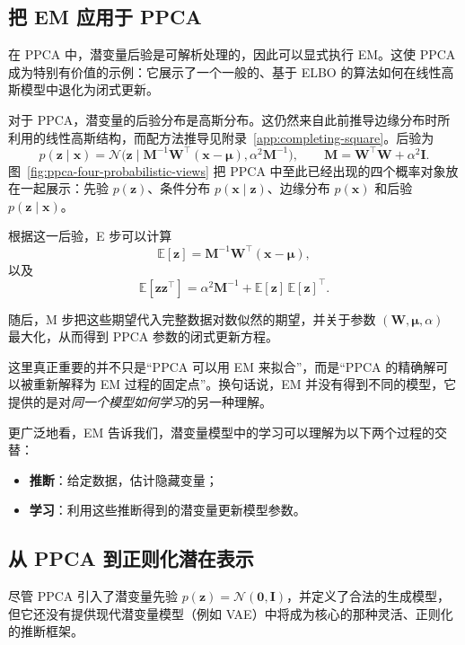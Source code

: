 

\subsection{把 EM 应用于 PPCA}

在 PPCA 中，潜变量后验是可解析处理的，因此可以显式执行 EM。这使 PPCA 成为特别有价值的示例：它展示了一个一般的、基于 ELBO 的算法如何在线性高斯模型中退化为闭式更新。

对于 PPCA，潜变量的后验分布是高斯分布。这仍然来自此前推导边缘分布时所利用的线性高斯结构，而配方法推导见附录~\ref{app:completing-square}。后验为
\[
p(\mathbf{z}\mid\mathbf{x})
=
\mathcal{N}\!\bigl(
\mathbf{z}\mid
\mathbf{M}^{-1}\mathbf{W}^\top(\mathbf{x}-\boldsymbol{\mu}),
\alpha^2\mathbf{M}^{-1}
\bigr),
\qquad
\mathbf{M}=\mathbf{W}^\top\mathbf{W}+\alpha^2\mathbf{I}.
\]
图~\ref{fig:ppca-four-probabilistic-views} 把 PPCA 中至此已经出现的四个概率对象放在一起展示：先验 \(p(\mathbf{z})\)、条件分布 \(p(\mathbf{x}\mid\mathbf{z})\)、边缘分布 \(p(\mathbf{x})\) 和后验 \(p(\mathbf{z}\mid\mathbf{x})\)。



根据这一后验，E 步可以计算
\[
\mathbb{E}[\mathbf{z}]
=
\mathbf{M}^{-1}\mathbf{W}^\top(\mathbf{x}-\boldsymbol{\mu}),
\]
以及
\[
\mathbb{E}[\mathbf{z}\mathbf{z}^\top]
=
\alpha^2\mathbf{M}^{-1}
+
\mathbb{E}[\mathbf{z}]\,\mathbb{E}[\mathbf{z}]^\top.
\]

随后，M 步把这些期望代入完整数据对数似然的期望，并关于参数 \((\mathbf{W},\boldsymbol{\mu},\alpha)\) 最大化，从而得到 PPCA 参数的闭式更新方程。

这里真正重要的并不只是“PPCA 可以用 EM 来拟合”，而是“PPCA 的精确解可以被重新解释为 EM 过程的固定点”。换句话说，EM 并没有得到不同的模型，它提供的是对\emph{同一个模型如何学习}的另一种理解。

更广泛地看，EM 告诉我们，潜变量模型中的学习可以理解为以下两个过程的交替：
\begin{itemize}
    \item \textbf{推断}：给定数据，估计隐藏变量；
    \item \textbf{学习}：利用这些推断得到的潜变量更新模型参数。
\end{itemize}

\subsection{从 PPCA 到正则化潜在表示}
尽管 PPCA 引入了潜变量先验 \(p(\mathbf{z})=\mathcal{N}(\mathbf{0},\mathbf{I})\)，并定义了合法的生成模型，但它还没有提供现代潜变量模型（例如 VAE）中将成为核心的那种灵活、正则化的推断框架。

